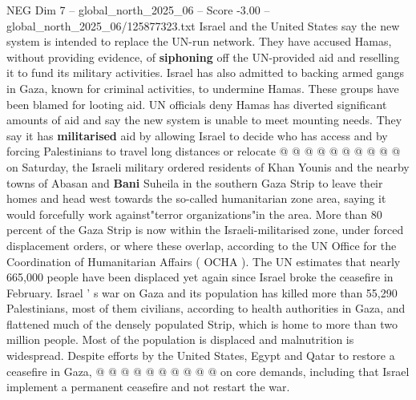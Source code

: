 \begin{textsample}{NEG Dim 7 – global\_north\_2025\_06 – Score -3.00 – global\_north\_2025\_06/125877323.txt}
Israel and the United States say the new system is intended to replace the UN-run network.
They have accused Hamas, without providing evidence, of \textbf{siphoning} off the UN-provided aid and reselling it to fund its military activities.
Israel has also admitted to backing armed gangs in Gaza, known for criminal activities, to undermine Hamas.
These groups have been blamed for looting aid.
UN officials deny Hamas has diverted significant amounts of aid and say the new system is unable to meet mounting needs.
They say it has \textbf{militarised} aid by allowing Israel to decide who has access and by forcing Palestinians to travel long distances or relocate @ @ @ @ @ @ @ @ @ @ on Saturday, the Israeli military ordered residents of Khan Younis and the nearby towns of Abasan and \textbf{Bani} Suheila in the southern Gaza Strip to leave their homes and head west towards the so-called humanitarian zone area, saying it would forcefully work against"terror organizations"in the area.
More than 80 percent of the Gaza Strip is now within the Israeli-militarised zone, under forced displacement orders, or where these overlap, according to the UN Office for the Coordination of Humanitarian Affairs ( OCHA ).
The UN estimates that nearly 665,000 people have been displaced yet again since Israel broke the ceasefire in February.
Israel ' s war on Gaza and its population has killed more than 55,290 Palestinians, most of them civilians, according to health authorities in Gaza, and flattened much of the densely populated Strip, which is home to more than two million people.
Most of the population is displaced and malnutrition is widespread.
Despite efforts by the United States, Egypt and Qatar to restore a ceasefire in Gaza, @ @ @ @ @ @ @ @ @ @ on core demands, including that Israel implement a permanent ceasefire and not restart the war.

\end{textsample}
